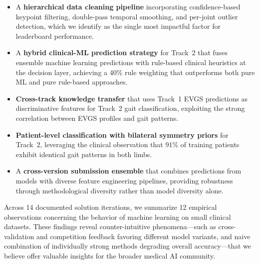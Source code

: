 \begin{itemize}[leftmargin=*,nosep]
    \item A \textbf{hierarchical data cleaning pipeline} incorporating confidence-based keypoint filtering, double-pass temporal smoothing, and per-joint outlier detection, which we identify as the single most impactful factor for leaderboard performance. 
    \item A \textbf{hybrid clinical-ML prediction strategy} for Track~2 that fuses ensemble machine learning predictions with rule-based clinical heuristics at the decision layer, achieving a 40\% rule weighting that outperforms both pure ML and pure rule-based approaches.
    \item \textbf{Cross-track knowledge transfer} that uses Track~1 EVGS predictions as discriminative features for Track~2 gait classification, exploiting the strong correlation between EVGS profiles and gait patterns.
    \item \textbf{Patient-level classification with bilateral symmetry priors} for Track~2, leveraging the clinical observation that 91\% of training patients exhibit identical gait patterns in both limbs.
    \item A \textbf{cross-version submission ensemble} that combines predictions from models with diverse feature engineering pipelines, providing robustness through methodological diversity rather than model diversity alone.
\end{itemize}

Across 14 documented solution iterations, we summarize 12 empirical observations concerning the behavior of machine learning on small clinical datasets. These findings reveal counter-intuitive phenomena---such as cross-validation and competition feedback favoring different model variants, and naive combination of individually strong methods degrading overall accuracy---that we believe offer valuable insights for the broader medical AI community.
